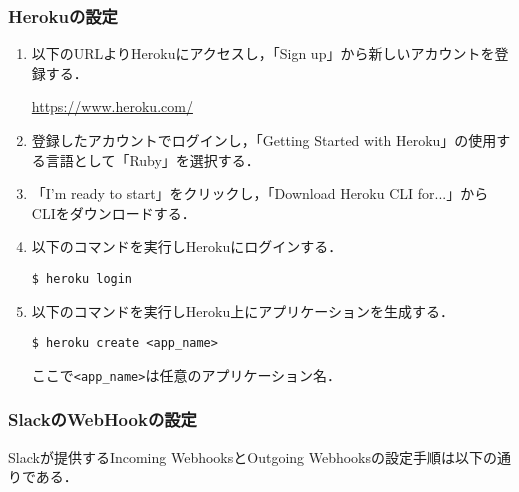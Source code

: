 \documentclass[fleqn, 14pt]{extarticlej}
\begin{document}
\subsubsection{Herokuの設定}
\begin{enumerate}
\item 以下のURLよりHerokuにアクセスし，「Sign up」から新しいアカウントを登録する．

  \url{https://www.heroku.com/}
\item 登録したアカウントでログインし，「Getting Started with Heroku」の使用する言語として「Ruby」を選択する．
\item 「I’m ready to start」をクリックし，「Download Heroku CLI for...」からCLIをダウンロードする．
\item 以下のコマンドを実行しHerokuにログインする．

  \verb|$ heroku login|
\item 以下のコマンドを実行しHeroku上にアプリケーションを生成する．

  \verb|$ heroku create <app_name>|

  ここで\verb|<app_name>|は任意のアプリケーション名．
\end{enumerate}
  
\subsubsection{SlackのWebHookの設定}
Slackが提供するIncoming WebhooksとOutgoing Webhooksの設定手順は以下の通りである．
\end{document}
